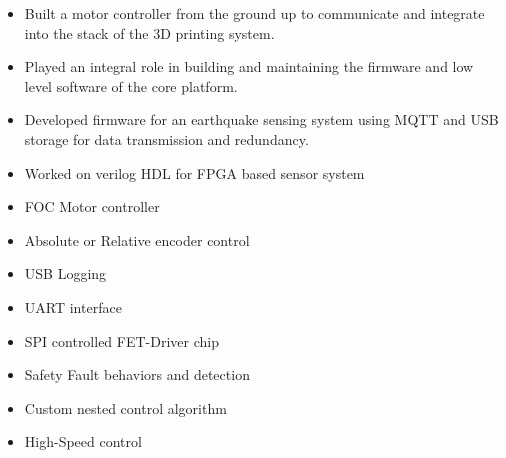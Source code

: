 \documentclass[10pt,a4paper,ragged2e,withhyper]{altacv}
\begin{document}


\makecvheader


\begin{paracol}{2}

\begin{itemize}
\item Built a motor controller from the ground up to communicate and integrate into the stack of the 3D printing system.
\item Played an integral role in building and maintaining the firmware and low level software of the core platform.
\end{itemize}

\divider

\begin{itemize}
\item Developed firmware for an earthquake sensing system using MQTT and USB storage for data transmission and redundancy.
\item Worked on verilog HDL for FPGA based sensor system
\end{itemize}


\begin{itemize}
\item FOC Motor controller
\item Absolute or Relative encoder control
\item USB Logging
\item UART interface
\item SPI controlled FET-Driver chip
\item Safety Fault behaviors and detection
\item Custom nested control algorithm
\item High-Speed control
\end{itemize}


\end{paracol}
\end{document}
